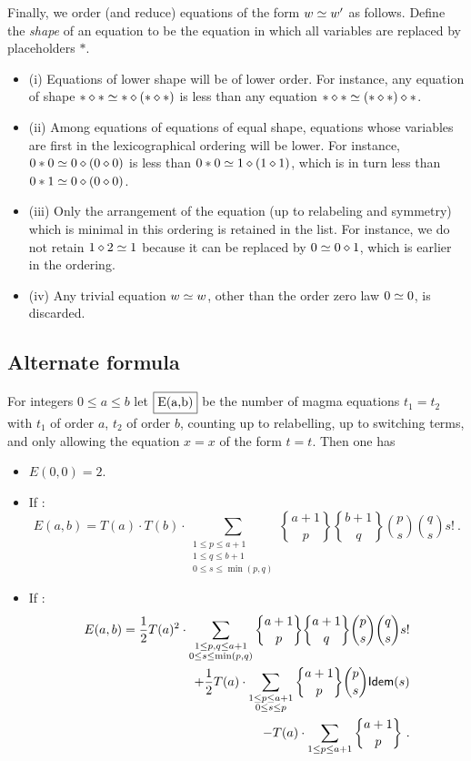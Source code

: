 Finally, we order (and reduce) equations of the form $w \simeq w'$ as follows. Define the \emph{shape} of an equation to be the equation in which all variables are replaced by placeholders $\ast$.
\begin{itemize}
  \item (i) Equations of lower shape will be of lower order.  For instance, any equation of shape $\ast \diamond \ast \simeq \ast \diamond (\ast \diamond \ast)$ is less than any equation $\ast \diamond \ast \simeq (\ast \diamond \ast) \diamond \ast$.
  \item (ii) Among equations of equations of equal shape, equations whose variables are first in the lexicographical ordering will be lower. For instance, $0 \ast 0 \simeq 0 \diamond (0 \diamond 0)$ is less than $0 \ast 0 \simeq 1 \diamond (1 \diamond 1)$, which is in turn less than $0 \ast 1 \simeq 0 \diamond (0 \diamond 0)$.
  \item (iii) Only the arrangement of the equation (up to relabeling and symmetry) which is minimal in this ordering is retained in the list.  For instance, we do not retain $1 \diamond 2 \simeq 1$ because it can be replaced by $0 \simeq 0 \diamond 1$, which is earlier in the ordering.
\item (iv) Any trivial equation $w \simeq w$, other than the order zero law $0 \simeq 0$, is discarded.
\end{itemize}

\subsection{Alternate formula}

For integers $0 \le a \le b$ let $\fbox{E(a,b)}$ be the number of magma equations $t_1 = t_2$ with $t_1$ of order $a$, $t_2$ of order $b$, counting up to relabelling, up to switching terms, and only allowing the equation $x=x$ of the form $t=t$.  Then one has

\begin{itemize}
\item $E(0,0) = 2$.
\item  If :
$$
E(a,b) = T(a)\cdot T(b) \cdot \sum_{\substack{1 \le p \le a+1\\ 1 \le q \le b+1\\0\le s \le \min(p,q)}}
{a+1 \brace p} {b+1 \brace q} {p \choose s} {q \choose s} s! \ .
$$
\item If :
\begin{align*}
E(a,b) = \frac{1}{2} T(a)^2\cdot \sum_{\substack{1 \le p,q \le a+1\\ 0\le s \le \min(p,q)}}
{a+1 \brace p} {a+1 \brace q} {p \choose s} \binom{q}{s} s! \\
+ \frac{1}{2} T(a) \cdot \sum_{\substack{1 \le p \le a+1\\ 0\le s \le p}}
{a+1 \brace p}  \binom{p}{s} {\sf Idem}(s)\\
- T(a)\cdot \sum_{1\le p \le a+1}  {a+1 \brace p} \ .
\end{align*}
\end{itemize}

